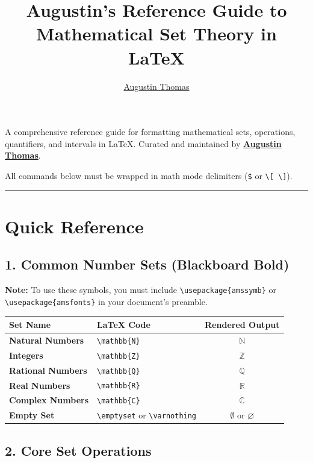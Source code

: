 \documentclass[11pt]{article}
\title{Augustin's Reference Guide to Mathematical Set Theory in \LaTeX}
\author{\href{https://github.com/iamaugustinthomas}{Augustin Thomas}}
\date{}
\begin{document}
\maketitle

A comprehensive reference guide for formatting mathematical sets, operations, quantifiers, and intervals in \LaTeX{}. Curated and maintained by \textbf{\href{https://github.com/iamaugustinthomas}{Augustin Thomas}}.

All commands below must be wrapped in math mode delimiters (\verb|$| or \verb|\[ \]|).

\vspace{1em}
\noindent\rule{\textwidth}{0.4pt}

\section*{\textbf{\Large Quick Reference}}

\subsection*{1. Common Number Sets (Blackboard Bold)}
\textbf{Note:} To use these symbols, you must include \verb|\usepackage{amssymb}| or \verb|\usepackage{amsfonts}| in your document's preamble.

\begin{table}[H]
\centering
\begin{tabular}{llc}
\toprule
\textbf{Set Name} & \textbf{\LaTeX{} Code} & \textbf{Rendered Output} \\
\midrule
\textbf{Natural Numbers} & \verb|\mathbb{N}| & $\mathbb{N}$ \\
\textbf{Integers} & \verb|\mathbb{Z}| & $\mathbb{Z}$ \\
\textbf{Rational Numbers} & \verb|\mathbb{Q}| & $\mathbb{Q}$ \\
\textbf{Real Numbers} & \verb|\mathbb{R}| & $\mathbb{R}$ \\
\textbf{Complex Numbers} & \verb|\mathbb{C}| & $\mathbb{C}$ \\
\textbf{Empty Set} & \verb|\emptyset| or \verb|\varnothing| & $\emptyset$ or $\varnothing$ \\
\bottomrule
\end{tabular}
\end{table}

\subsection*{2. Core Set Operations}
\end{document}
